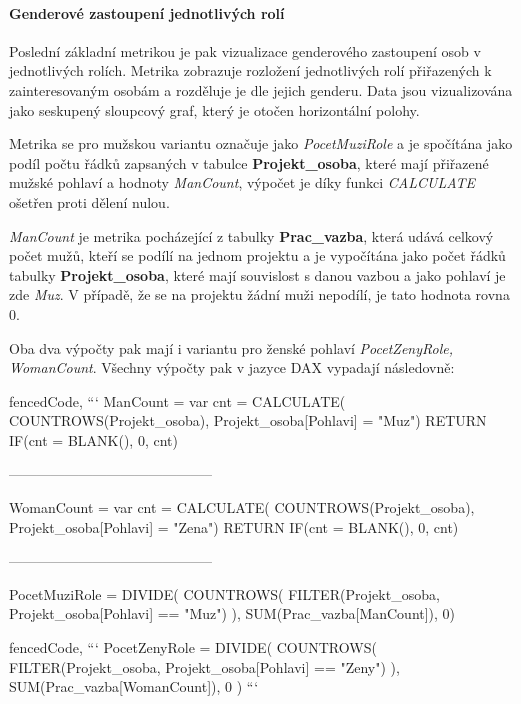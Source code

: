 \documentclass[
  digital,     %
  twoside,     %
  lof,         %
  lot,         %
]{fithesis4}
\begin{document}
\paragraph{Genderové zastoupení jednotlivých rolí}
Poslední základní metrikou je pak vizualizace genderového zastoupení osob v jednotlivých rolích. Metrika zobrazuje rozložení jednotlivých rolí přiřazených k zainteresovaným osobám a rozděluje je dle jejich genderu. Data jsou vizualizována jako seskupený sloupcový graf, který je otočen horizontální polohy.  

Metrika se pro mužskou variantu označuje jako \emph{PocetMuziRole} a je spočítána jako podíl počtu řádků zapsaných v tabulce \textbf{Projekt\_osoba}, které mají přiřazené mužské pohlaví a hodnoty \emph{ManCount}, výpočet je díky funkci \emph{CALCULATE} ošetřen proti dělení nulou.

\emph{ManCount} je metrika pocházející z tabulky \textbf{Prac\_vazba}, která udává celkový počet mužů, kteří se podílí na jednom projektu a je vypočítána jako počet řádků tabulky \textbf{Projekt\_osoba}, které mají souvislost s danou vazbou a jako pohlaví je zde \emph{Muz}. V případě, že se na projektu žádní muži nepodílí, je tato hodnota rovna 0.

Oba dva výpočty pak mají i variantu pro ženské pohlaví \emph{PocetZenyRole, WomanCount}. Všechny výpočty pak v jazyce DAX vypadají následovně:

\begin{tcolorbox}
\begin{markdown*}{%
  fencedCode,
}
```
ManCount = 
var cnt = CALCULATE(
    COUNTROWS(Projekt_osoba),
    Projekt_osoba[Pohlavi] = "Muz") 
RETURN IF(cnt = BLANK(), 0, cnt)

--------------------------------------------

WomanCount = 
var cnt = CALCULATE(
    COUNTROWS(Projekt_osoba),
    Projekt_osoba[Pohlavi] = "Zena") 
RETURN IF(cnt = BLANK(), 0, cnt)

--------------------------------------------

PocetMuziRole = DIVIDE(
        COUNTROWS(
            FILTER(Projekt_osoba,
                   Projekt_osoba[Pohlavi] == "Muz")
                ), 
            SUM(Prac_vazba[ManCount]), 0)
\end{markdown*}
\end{tcolorbox}

\begin{tcolorbox}
\begin{markdown*}{%
  fencedCode,
}
```
PocetZenyRole = DIVIDE(
        COUNTROWS(
            FILTER(Projekt_osoba,
                   Projekt_osoba[Pohlavi] == "Zeny")
                ),
            SUM(Prac_vazba[WomanCount]), 0
        )
```
\end{markdown*}
\end{tcolorbox}
\shorthandoff{-}
\end{document}
